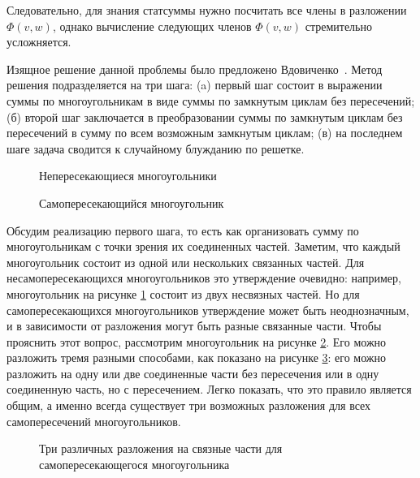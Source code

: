 Следовательно, для знания статсуммы нужно посчитать все члены в разложении $\Phi(v, w)$, однако вычисление следующих членов $\Phi(v, w)$ стремительно усложняется. 

Изящное решение данной проблемы было предложено Вдовиченко~\cite{vdovichenko1965}. Метод решения подразделяется на три шага: (a) первый шаг состоит в выражении суммы по многоугольникам в виде суммы по замкнутым циклам без пересечений; (б) второй шаг заключается в преобразовании суммы по замкнутым циклам без пересечений в сумму по всем возможным замкнутым циклам; (в) на последнем шаге задача сводится к случайному блужданию по решетке.

 \begin{figure}[h]
 	\caption{Непересекающиеся многоугольники}
 	\label{noInterpolygons}
 \end{figure}   

 \begin{figure}[h]
 	\caption{Самопересекающийся многоугольник}
 	\label{selfpolygons}
 \end{figure}  

Обсудим реализацию первого шага, то есть как организовать сумму по многоугольникам с точки зрения их соединенных частей. Заметим, что каждый многоугольник состоит из одной или нескольких связанных частей. Для несамопересекающихся многоугольников это утверждение очевидно: например, многоугольник на рисунке \ref{noInterpolygons} состоит из двух несвязных частей. Но для самопересекающихся многоугольников утверждение может быть неоднозначным, и в зависимости от разложения могут быть разные связанные части. Чтобы прояснить этот вопрос, рассмотрим многоугольник на рисунке \ref{selfpolygons}. Его можно разложить тремя разными способами, как показано на рисунке \ref{threeVarPoly}: его можно разложить на одну или две соединенные части без пересечения или в одну соединенную часть, но с пересечением. Легко показать, что это правило является общим, а именно всегда существует три возможных разложения для всех самопересечений многоугольников. 

 \begin{figure}[h]
 	\caption{Три различных разложения на связные части для самопересекающегося многоугольника}
 	\label{threeVarPoly}
 \end{figure}

